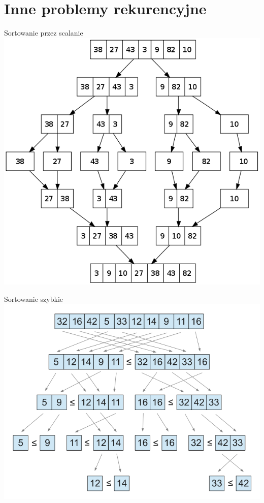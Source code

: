 \section{Inne problemy rekurencyjne}\label{sec:inneProblemyRekurencyjne}
\begin{frame}{Sortowanie przez scalanie}
    \includegraphics[width=\textwidth,height=0.8\textheight]{recursion/graphics/mergesort.png}
\end{frame}
\begin{frame}{Sortowanie szybkie}
    \includegraphics[width=\textwidth,height=0.8\textheight]{recursion/graphics/quicksort.png}
\end{frame}
